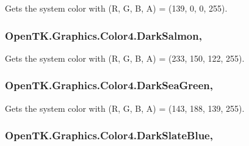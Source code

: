 Gets the system color with (R, G, B, A) = (139, 0, 0, 255). 

\hypertarget{struct_open_t_k_1_1_graphics_1_1_color4_aa3ad4d1615215571d596087aa4c0fb01}{
\subsubsection[{Dark\-Salmon}]{ Open\-T\-K.\-Graphics.\-Color4.\-Dark\-Salmon\hspace{0.3cm}{\ttfamily [static]}, {\ttfamily [get]}}}\label{struct_open_t_k_1_1_graphics_1_1_color4_aa3ad4d1615215571d596087aa4c0fb01}


Gets the system color with (R, G, B, A) = (233, 150, 122, 255). 

\hypertarget{struct_open_t_k_1_1_graphics_1_1_color4_afadd45aa9fbfd0f1c18c948b248c44b0}{
\subsubsection[{Dark\-Sea\-Green}]{ Open\-T\-K.\-Graphics.\-Color4.\-Dark\-Sea\-Green\hspace{0.3cm}{\ttfamily [static]}, {\ttfamily [get]}}}\label{struct_open_t_k_1_1_graphics_1_1_color4_afadd45aa9fbfd0f1c18c948b248c44b0}


Gets the system color with (R, G, B, A) = (143, 188, 139, 255). 

\hypertarget{struct_open_t_k_1_1_graphics_1_1_color4_adf181fb3690e35eb5c01c7bf8c5879eb}{
\subsubsection[{Dark\-Slate\-Blue}]{ Open\-T\-K.\-Graphics.\-Color4.\-Dark\-Slate\-Blue\hspace{0.3cm}{\ttfamily [static]}, {\ttfamily [get]}}}\label{struct_open_t_k_1_1_graphics_1_1_color4_adf181fb3690e35eb5c01c7bf8c5879eb}


